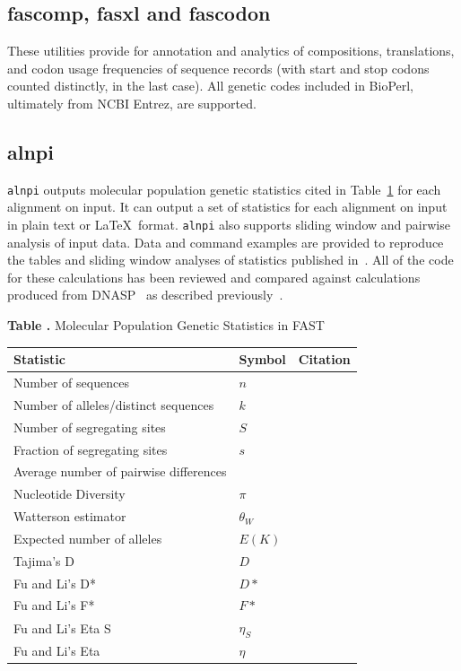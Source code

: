 \documentclass{frontiersSCNS} %
\begin{document}
\subsection{fascomp, fasxl and fascodon}

These utilities provide for annotation and analytics of compositions,
translations, and codon usage frequencies of sequence records (with
start and stop codons counted distinctly, in the last case). All
genetic codes included in BioPerl, ultimately from NCBI Entrez, are
supported.

\subsection{alnpi}
    
{\tt alnpi} outputs molecular population genetic statistics cited in
Table~\ref{tab:pgstats} for each alignment on input. It can output a
set of statistics for each alignment on input in plain text or
\LaTeX~format. {\tt alnpi} also supports sliding window and pairwise
analysis of input data. Data and command examples are provided to
reproduce the tables and sliding window analyses of statistics
published in~\citep{Ardell03}.  All of the code for these calculations
has been reviewed and compared against calculations produced from
DNASP~\citep{Librado01062009} as described
previously~\citep{Ardell12082004}.

\begin{table}[!t]
\textbf{\label{tab:pgstats} Table .}{
  Molecular Population Genetic Statistics in FAST }

\processtable{ }
{\begin{tabular}{lll}\toprule
    Statistic  & Symbol  & Citation \\
\midrule
Number of sequences & $n$ & \\
Number of alleles/distinct sequences & $k$ & \\
Number of segregating sites & $S$ & \\
Fraction of segregating sites & $s$ & \\
Average number of pairwise differences &  & \citep{NeiLi79} \\
Nucleotide Diversity & $\pi$ &  \citep{NeiLi79} \\
Watterson estimator & $\theta_W$ & \citep{watterson1975number} \\
Expected number of alleles & $E(K)$ & \citep{ewens1972sampling} \\
Tajima's D & $D$ & \citep{Tajima89c} \\
Fu and Li's D* & $D*$ & \citep{FuLi93b} \\
Fu and Li's F* & $F*$ & \citep{FuLi93b,SimonsenEtAl95} \\
Fu and Li's Eta S & $\eta_S$ &  \citep{FuLi93b} \\
Fu and Li's Eta & $\eta$ &  \citep{FuLi93b} \\
\end{tabular}}{}
\end{table}
\end{document}

